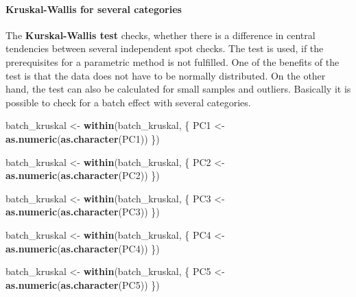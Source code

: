 \documentclass[]{article}
\newenvironment{Shaded}{\begin{snugshade}}{\end{snugshade}}
\newcommand{\KeywordTok}[1]{\textcolor[rgb]{0.13,0.29,0.53}{\textbf{#1}}}
\newcommand{\StringTok}[1]{\textcolor[rgb]{0.31,0.60,0.02}{#1}}
\newcommand{\NormalTok}[1]{#1}
\let\oldparagraph\paragraph
\renewcommand{\paragraph}[1]{\oldparagraph{#1}\mbox{}}
\begin{document}
\paragraph{Kruskal-Wallis for several
categories}\label{kruskal-wallis-for-several-categories}

The \textbf{Kurskal-Wallis test} checks, whether there is a difference
in central tendencies between several independent spot checks. The test
is used, if the prerequisites for a parametric method is not fulfilled.
One of the benefits of the test is that the data does not have to be
normally distributed. On the other hand, the test can also be calculated
for small samples and outliers. Basically it is possible to check for a
batch effect with several categories.

\begin{Shaded}
\begin{Highlighting}[]
\NormalTok{batch_kruskal <-}\StringTok{ }\KeywordTok{within}\NormalTok{(batch_kruskal, \{}
\NormalTok{  PC1 <-}\StringTok{ }\KeywordTok{as.numeric}\NormalTok{(}\KeywordTok{as.character}\NormalTok{(PC1))}
\NormalTok{\})}

\NormalTok{batch_kruskal <-}\StringTok{ }\KeywordTok{within}\NormalTok{(batch_kruskal, \{}
\NormalTok{  PC2 <-}\StringTok{ }\KeywordTok{as.numeric}\NormalTok{(}\KeywordTok{as.character}\NormalTok{(PC2))}
\NormalTok{\})}

\NormalTok{batch_kruskal <-}\StringTok{ }\KeywordTok{within}\NormalTok{(batch_kruskal, \{}
\NormalTok{  PC3 <-}\StringTok{ }\KeywordTok{as.numeric}\NormalTok{(}\KeywordTok{as.character}\NormalTok{(PC3))}
\NormalTok{\})}

\NormalTok{batch_kruskal <-}\StringTok{ }\KeywordTok{within}\NormalTok{(batch_kruskal, \{}
\NormalTok{  PC4 <-}\StringTok{ }\KeywordTok{as.numeric}\NormalTok{(}\KeywordTok{as.character}\NormalTok{(PC4))}
\NormalTok{\})}

\NormalTok{batch_kruskal <-}\StringTok{ }\KeywordTok{within}\NormalTok{(batch_kruskal, \{}
\NormalTok{  PC5 <-}\StringTok{ }\KeywordTok{as.numeric}\NormalTok{(}\KeywordTok{as.character}\NormalTok{(PC5))}
\NormalTok{\})}


\end{Highlighting}
\end{Shaded}
\end{document}
